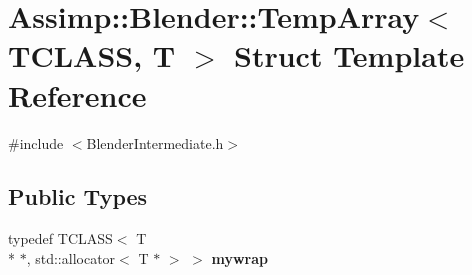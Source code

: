 \hypertarget{struct_assimp_1_1_blender_1_1_temp_array}{\section{Assimp\+:\+:Blender\+:\+:Temp\+Array$<$ T\+C\+L\+A\+S\+S, T $>$ Struct Template Reference}
\label{struct_assimp_1_1_blender_1_1_temp_array}
}


{\ttfamily \#include $<$Blender\+Intermediate.\+h$>$}

\subsection*{Public Types}
\begin{DoxyCompactItemize}
\item 
\hypertarget{struct_assimp_1_1_blender_1_1_temp_array_adde2a5f055a4271f5450c453e197adba}{typedef T\+C\+L\+A\+S\+S$<$ T \\*
$\ast$, std\+::allocator$<$ T $\ast$ $>$ $>$ {\bfseries mywrap}}\label{struct_assimp_1_1_blender_1_1_temp_array_adde2a5f055a4271f5450c453e197adba}

\end{DoxyCompactItemize}
